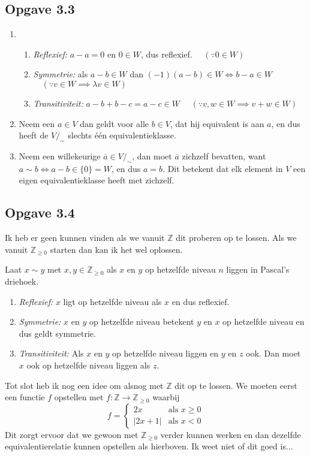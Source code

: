 \documentclass{article}
\newcommand{\Zg}{\mathbb{Z}_{\geq 0}}
\newcommand{\Z}{\mathbb{Z}}
\newcommand{\q}{/_\sim}
\newcommand{\ol}[1]{\overline{#1}}
\newcommand{\tx}[1]{\text{#1}}
\begin{document}
\subsection*{Opgave 3.3}
\begin{enumerate}[label=\alph*)]
    \item
          \begin{enumerate}[label=\arabic*]
              \item \emph{Reflexief:} $a-a = 0$ en $0 \in W$,
                    dus reflexief.
                    $\quad (\because 0 \in W)$
              \item \emph{Symmetrie:} als $a-b \in W$
                    dan $(-1)(a - b) \in W
                        \Longleftrightarrow b - a\in W $
                    $\quad (\because v \in W \implies \lambda v \in W)$
              \item \emph{Transitiviteit:} $a - b + b - c  =
                        a - c \in W$
                    $\quad (\because v, w \in W \implies v + w \in W)$
          \end{enumerate}
    \item
          Neem een $a \in V$ dan geldt voor alle $b \in V$,
          dat hij equivalent is aan $a$, en dus heeft de
          $V\q$ slechts één equivalentieklasse.
    \item
          Neem een willekeurige $\ol{a} \in V\q$,
          dan moet $\ol{a}$ zichzelf bevatten,
          want $a \sim b \Leftrightarrow a-b \in \{0\} = W$, en
          dus $a = b$. Dit betekent dat elk element in $V$
          een eigen equivalentieklasse heeft met zichzelf.
\end{enumerate}
\subsection*{Opgave 3.4}
Ik heb er geen kunnen vinden als we vanuit $\Z$ dit proberen op te lossen.
Als we vanuit $\Zg$ starten dan kan ik het wel oplossen.

Laat $x \sim y$ met $x, y \in \Zg$ als $x$ en $y$ op hetzelfde niveau $n$ liggen in Pascal's driehoek.
\begin{enumerate}[label=\arabic*]
    \item \emph{Reflexief:} $x$ ligt op hetzelfde niveau als $x$ en dus reflexief.
    \item \emph{Symmetrie:} $x$ en $y$ op hetzelfde niveau betekent $y$ en $x$
          op hetzelfde niveau en dus geldt symmetrie.
    \item \emph{Transitiviteit:} Als $x$ en $y$ op hetzelfde niveau liggen en $y$ en $z$ ook.
          Dan moet $x$ ook op hetzelfde niveau liggen als $z$.
\end{enumerate}
Tot slot heb ik nog een idee om alsnog met $\Z$ dit op te lossen.
We moeten eerst een functie $f$ opstellen met $f: \Z \rightarrow \Zg$ waarbij
\[
    f = \begin{cases}
        2x       & \tx{als } x \geq 0 \\
        |2x + 1| & \tx{als } x < 0
    \end{cases}
\]
Dit zorgt ervoor dat we gewoon met $\Zg$ verder kunnen werken en dan
dezelfde equivalentierelatie kunnen opstellen als hierboven.
Ik weet niet of dit goed is...
\end{document}
